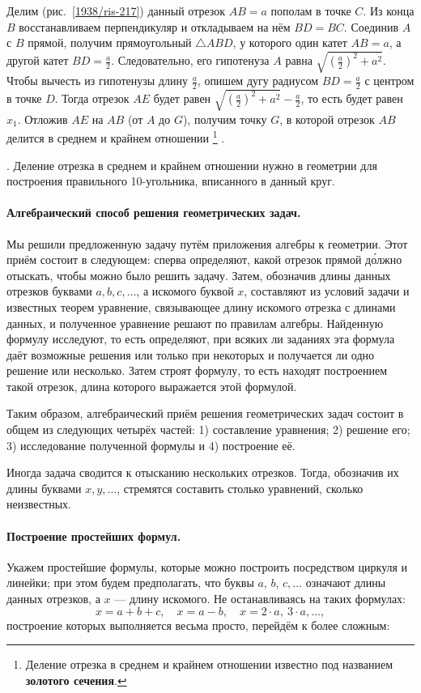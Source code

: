 \documentclass[twoside]{book}
\makeatletter
\newcommand{\rindex}[2][\imki@jobname]{%
  \index[#1]{\detokenize{#2}}%
}
\makeatother
\begin{document}
Делим (рис.~\ref{1938/ris-217}) данный отрезок $AB=a$ пополам в точке $C$.
Из конца $B$ восстанавливаем перпендикуляр и откладываем на нём $BD = BC$.
Соединив $A$ с $B$ прямой, получим прямоугольный $\triangle ABD$, у которого один катет $AB=a$, а другой катет $BD=\frac a2$.
Следовательно, его гипотенуза $A$ равна $\sqrt{(\frac a2)^2+a^2}$.
Чтобы вычесть из гипотенузы длину $\frac a2$, опишем дугу радиусом $BD=\frac a2$ с центром в точке $D$.
Тогда отрезок $AE$ будет равен $\sqrt{(\frac a2)^2+a^2}-\frac a2$, 
то есть будет равен $x_1$.
Отложив $AE$ на $AB$ (от $A$ до $G$), получим точку $G$, в которой отрезок $AB$ делится в среднем и крайнем отношении%
\footnote{Деление отрезка в среднем и крайнем отношении известно под названием \rindex{золотое сечение}\textbf{золотого сечения}.}%
.

\smallskip
{}.
Деление отрезка в среднем и крайнем отношении нужно в геометрии для построения правильного 10-угольника, вписанного в данный круг.

\paragraph{Алгебраический способ решения геометрических задач.}\label{1938/210}
Мы решили предложенную задачу путём приложения алгебры к геометрии.
Этот приём состоит в следующем:
сперва определяют, какой отрезок прямой д\'{о}лжно отыскать, чтобы можно было решить задачу.
Затем, обозначив длины данных отрезков буквами $a, b, c,\dots$, а искомого буквой $x$, составляют из условий задачи и известных теорем уравнение, связывающее длину искомого отрезка с длинами данных, и полученное уравнение решают по правилам алгебры.
Найденную формулу исследуют, то есть определяют, при всяких ли заданиях эта формула даёт возможные решения или только при некоторых и получается ли одно решение или несколько.
Затем строят формулу, то есть находят построением такой отрезок, длина которого выражается этой формулой.

Таким образом, алгебраический приём решения геометрических задач состоит в общем из следующих четырёх частей:
1) составление уравнения;
2) решение его;
3) исследование полученной формулы и 4) построение её.

Иногда задача сводится к отысканию нескольких отрезков.
Тогда, обозначив их длины буквами $x,y,\dots$, стремятся составить столько уравнений, сколько неизвестных.

\paragraph{Построение простейших формул.}\label{1938/211}
Укажем простейшие формулы, которые можно построить посредством циркуля и линейки;
при этом будем предполагать, что буквы $a$, $b$, $c,\dots$
означают длины данных отрезков, а $x$ — длину искомого.
Не останавливаясь на таких формулах:
\[x=a+b+c,
 \quad
 x=a-b,
 \quad
 x=2\cdot a,\ 3\cdot a,\dots,
\]
построение которых выполняется весьма просто, перейдём к более сложным:
\end{document}
